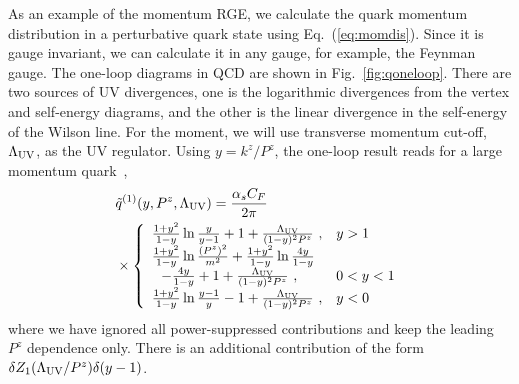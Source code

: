 As an example of the momentum RGE,
we calculate the quark momentum distribution
in a perturbative quark state using Eq.~(\ref{eq:momdis}).
Since it is gauge invariant, we can calculate it
in any gauge, for example, the Feynman gauge. The one-loop diagrams in QCD are shown in Fig.~\ref{fig:qoneloop}. There are two sources of UV
divergences, one is the logarithmic divergences from the vertex and self-energy diagrams, and the other
is the linear divergence in the self-energy of the Wilson line.
For the moment, we will use transverse momentum cut-off, $\Lambda_{\rm UV}$,  as the
UV regulator.  Using $y=k^z/P^z$, the one-loop result reads
for a large momentum quark~\cite{Xiong:2013bka},
\begin{align}\label{unpolvertex}
	& \tilde q^{(1)}(y,P^z,\Lambda_{\rm UV})=\frac{\alpha_s C_F}{2\pi} \nonumber
	\\
	& \times \left\{ \begin{array} {ll} \frac{1+y^2}{1-y}\ln \frac{y}{y-1}+1
		+\frac{\Lambda_{\rm UV}}{(1-y)^2P^z}\ , & y>1 \\
		\frac{1+y^2}{1-y}\ln \frac{(P^z)^2}{m^2}+\frac{1+y^2}{1-y}\ln\frac{4y}{1-y} \\
		\, \, \, \, -\frac{4y}{1-y}+1+\frac{\Lambda_{\rm UV}}{(1-y)^2P^z}\ , & 0<y<1 \\ \frac{1+y^2}{1-y}\ln \frac{y-1}{y}-1+\frac{\Lambda_{\rm UV}}{(1-y)^2P^z}\ , & y<0 \end{array} \right.
\end{align}
where we have ignored all power-suppressed contributions and keep the leading $P^z$ dependence only.
There is an additional contribution of the form $\delta Z_1(\Lambda_{\rm UV}/P^z) \delta(y-1)$.


